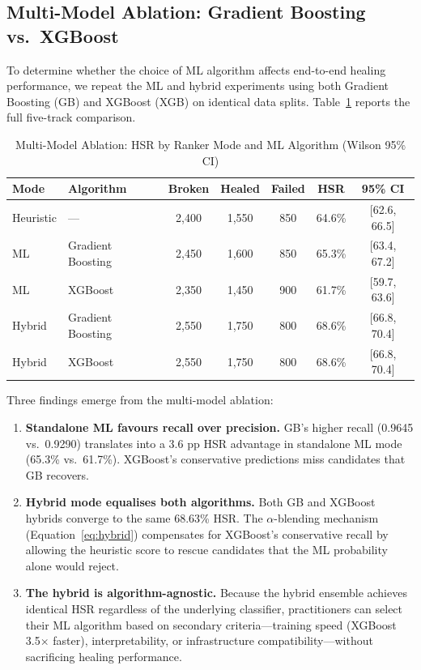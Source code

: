 \documentclass[12pt]{article}
\begin{document}
\subsection{Multi-Model Ablation: Gradient Boosting vs.\ XGBoost}
\label{sec:multimodel}

To determine whether the choice of ML algorithm affects end-to-end healing performance, we repeat the ML and hybrid experiments using both Gradient Boosting (GB) and XGBoost (XGB) on identical data splits. Table~\ref{tab:multimodel_ablation} reports the full five-track comparison.

\begin{table}[H]
\centering
\caption{Multi-Model Ablation: HSR by Ranker Mode and ML Algorithm (Wilson 95\% CI)}
\label{tab:multimodel_ablation}
\begin{tabular}{llccccc}
\toprule
Mode & Algorithm & Broken & Healed & Failed & HSR & 95\% CI \\
\midrule
Heuristic & --- & 2,400 & 1,550 & 850 & 64.6\% & [62.6, 66.5] \\
ML & Gradient Boosting & 2,450 & 1,600 & 850 & 65.3\% & [63.4, 67.2] \\
ML & XGBoost & 2,350 & 1,450 & 900 & 61.7\% & [59.7, 63.6] \\
Hybrid & Gradient Boosting & 2,550 & 1,750 & 800 & 68.6\% & [66.8, 70.4] \\
Hybrid & XGBoost & 2,550 & 1,750 & 800 & 68.6\% & [66.8, 70.4] \\
\bottomrule
\end{tabular}
\end{table}

Three findings emerge from the multi-model ablation:

\begin{enumerate}[leftmargin=1.5em]
\item \textbf{Standalone ML favours recall over precision.} GB's higher recall (0.9645 vs.\ 0.9290) translates into a 3.6 pp HSR advantage in standalone ML mode (65.3\% vs.\ 61.7\%). XGBoost's conservative predictions miss candidates that GB recovers.

\item \textbf{Hybrid mode equalises both algorithms.} Both GB and XGBoost hybrids converge to the same 68.63\% HSR. The $\alpha$-blending mechanism (Equation~\ref{eq:hybrid}) compensates for XGBoost's conservative recall by allowing the heuristic score to rescue candidates that the ML probability alone would reject.

\item \textbf{The hybrid is algorithm-agnostic.} Because the hybrid ensemble achieves identical HSR regardless of the underlying classifier, practitioners can select their ML algorithm based on secondary criteria---training speed (XGBoost 3.5$\times$ faster), interpretability, or infrastructure compatibility---without sacrificing healing performance.
\end{enumerate}
\end{document}
